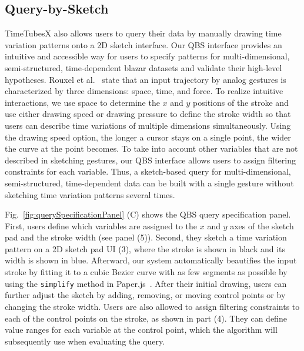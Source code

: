 \subsection{Query-by-Sketch}\label{sec:QBS}
TimeTubesX also allows users to query their data by manually drawing time variation patterns onto a 2D sketch interface.
Our QBS interface provides an intuitive and accessible way for users to specify patterns for multi-dimensional, semi-structured, time-dependent blazar datasets and validate their high-level hypotheses.
Rouxel et al.~\cite{Rouxel2014} state that an input trajectory by analog gestures is characterized by three dimensions: space, time, and force.
To realize intuitive interactions, 
we use space to determine the $x$ and $y$ positions of the stroke
and use either drawing speed or drawing pressure to define the stroke width 
so that users can describe time variations of multiple dimensions simultaneously.
Using the drawing speed option, the longer a cursor stays on a single point, the wider the curve at the point becomes.
To take into account other variables that are not described in sketching gestures, 
our QBS interface allows users to assign filtering constraints for each variable.
Thus, a sketch-based query for multi-dimensional, semi-structured, time-dependent data can be built with a single gesture
without sketching time variation patterns several times.

Fig.~\ref{fig:querySpecificationPanel} (C) shows the QBS query specification panel.
First, users define which variables are assigned to the $x$ and $y$ axes of the sketch pad and the stroke width (see panel (5)).
Second, they sketch a time variation pattern on a 2D sketch pad UI (3),
where the stroke is shown in black and its width is shown in blue.
Afterward, our system automatically beautifies the input stroke by fitting it to a cubic Bezier curve with as few segments as possible by using the \texttt{simplify} method in Paper.js~\cite{paper_framework}.
After their initial drawing, users can further adjust the sketch
by adding, removing, or moving control points or by changing the stroke width.
Users are also allowed to assign filtering constraints to each of the control points on the stroke, as shown in part (4).
They can define value ranges for each variable at the control point, which the algorithm will subsequently use when evaluating the query.

